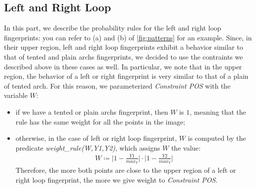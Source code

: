 \documentclass[8pt]{article}
\begin{document}
\subsection{Left and Right Loop}
%
In this part, we describe the probability rules for the left and right loop
fingerprints: you can refer to (a) and (b) of \cref{fig:patterns} for an example.
Since, in their upper region, left and right loop fingerprints exhibit a behavior similar
to that of tented and plain archs fingerprints, we decided to use the
contraints we described above in these cases as well. In particular, we
note that in the upper region, the behavior of a left or right fingerprint is
very similar to that of a plain of tented arch. For this reason, we
parameterized \emph{Constraint POS} with the variable $W$:
  \begin{itemize}
    \item
      if we have a tented or plain archs fingerprint, then $W$ is $1$, meaning
      that the rule has the same weight for all the points in the image;
    \item
      otherwise, in the case of left or right loop fingerprint, $W$ is
      computed by the predicate \emph{weight\_rule(W,Y1,Y2)}, which assigns 
      $W$ the value:
        \begin{align*}
          W \coloneqq 
          \lvert 1-\frac{Y1}{max_Y} \rvert 
          \cdot 
          \lvert 1-\frac{Y2}{max_Y} \rvert
        \end{align*}
      Therefore, the more both points are close to the upper region of a
      left or right loop fingerprint, the more we give weight to \emph{Constraint POS}.
  \end{itemize}
\end{document}
